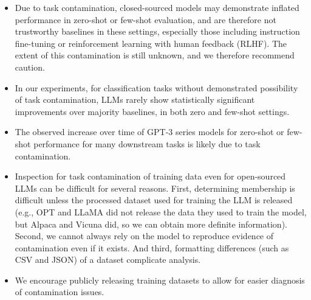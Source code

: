 \documentclass[letterpaper]{article} %
\newcommand{\nilay}[1]{}
\newcommand{\jmfb}[1]{}      %
\begin{document}
\begin{itemize}
    \item Due to task contamination, closed-sourced models may demonstrate inflated performance in zero-shot or few-shot evaluation, and are therefore not trustworthy baselines in these settings, especially those including instruction fine-tuning or reinforcement learning with human feedback (RLHF)\nilay{cite RLHF here?}. The extent of this contamination is still unknown, and we therefore recommend caution.

    \item In our experiments, for classification tasks without demonstrated possibility of task contamination, LLMs rarely show statistically significant improvements over majority baselines, in both zero and few-shot settings.

    \item The observed increase over time of GPT-3 series models for zero-shot or few-shot performance for many downstream tasks is likely due to task contamination. \nilay{kinda the same as the previous bullet. Think we can remove?}

    \item Inspection for task contamination of training data even for open-sourced LLMs can be difficult for several reasons. First, determining membership is difficult unless the processed dataset used for training the LLM is released (e.g., OPT and LLaMA did not release the data they used to train the model, but Alpaca and Vicuna did, so we can obtain more definite information). Second, we cannot always rely on the model to reproduce evidence of contamination even if it exists. And third, formatting differences (such as CSV and JSON) of a dataset complicate analysis.

    \item We encourage publicly releasing training datasets to allow for easier diagnosis of contamination issues. \nilay{Also related to previous bullet, we can probably find a way to merge these}

\end{itemize}

\jmfb{Recommend Against Using Highest Performing Closed Models as Baselines, since they may not be zero or few-shot.}

\jmfb{Performance increase over time for GPT-3, partially due to dataset contamination}
\end{document}
